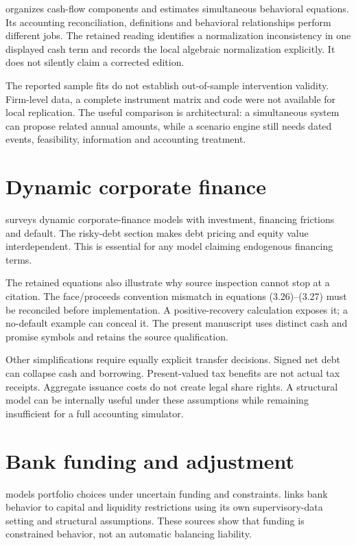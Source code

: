 \citet{gentryhoque1990wp} organizes cash-flow components and estimates simultaneous behavioral equations. Its accounting reconciliation, definitions and behavioral relationships perform different jobs. The retained reading identifies a normalization inconsistency in one displayed cash term and records the local algebraic normalization explicitly. It does not silently claim a corrected edition.

The reported sample fits do not establish out-of-sample intervention validity. Firm-level data, a complete instrument matrix and code were not available for local replication. The useful comparison is architectural: a simultaneous system can propose related annual amounts, while a scenario engine still needs dated events, feasibility, information and accounting treatment.

\section{Dynamic corporate finance}
\citet{strebulaev2012} surveys dynamic corporate-finance models with investment, financing frictions and default. The risky-debt section makes debt pricing and equity value interdependent. This is essential for any model claiming endogenous financing terms.

The retained equations also illustrate why source inspection cannot stop at a citation. The face/proceeds convention mismatch in equations (3.26)--(3.27) must be reconciled before implementation. A positive-recovery calculation exposes it; a no-default example can conceal it. The present manuscript uses distinct cash and promise symbols and retains the source qualification.

Other simplifications require equally explicit transfer decisions. Signed net debt can collapse cash and borrowing. Present-valued tax benefits are not actual tax receipts. Aggregate issuance costs do not create legal share rights. A structural model can be internally useful under these assumptions while remaining insufficient for a full accounting simulator.

\section{Bank funding and adjustment}
\citet{halaj2016} models portfolio choices under uncertain funding and constraints. \citet{behn2019} links bank behavior to capital and liquidity restrictions using its own supervisory-data setting and structural assumptions. These sources show that funding is constrained behavior, not an automatic balancing liability.

